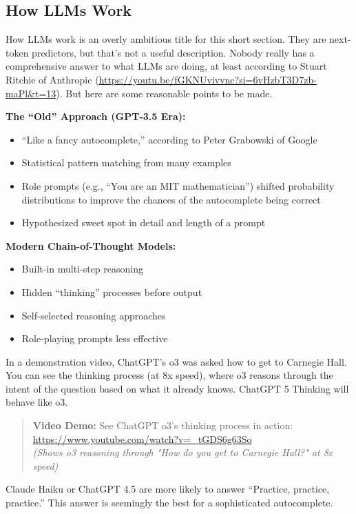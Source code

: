 \subsection{How LLMs Work}

How LLMs work is an overly ambitious title for this short section. They are next-token predictors, but that's not a useful description. Nobody really has a comprehensive answer to what LLMs are doing, at least according to Stuart Ritchie of Anthropic (\url{https://youtu.be/fGKNUvivvnc?si=6vHzbT3D7zb-maPl&t=13}). But here are some reasonable points to be made.

\textbf{The ``Old'' Approach (GPT-3.5 Era):}
\begin{itemize}
\item ``Like a fancy autocomplete,'' according to Peter Grabowski of Google
\item Statistical pattern matching from many examples
\item Role prompts (e.g., ``You are an MIT mathematician'') shifted probability distributions to improve the chances of the autocomplete being correct
\item Hypothesized sweet spot in detail and length of a prompt
\end{itemize}

\textbf{Modern Chain-of-Thought Models:}
\begin{itemize}
\item Built-in multi-step reasoning
\item Hidden ``thinking'' processes before output
\item Self-selected reasoning approaches
\item Role-playing prompts less effective
\end{itemize}

In a demonstration video, ChatGPT's o3 was asked how to get to Carnegie Hall. You can see the thinking process (at 8x speed), where o3 reasons through the intent of the question based on what it already knows. ChatGPT 5 Thinking will behave like o3.

\begin{quote}
\textbf{Video Demo:} See ChatGPT o3's thinking process in action: \\
\url{https://www.youtube.com/watch?v=_tGDS6g63So} \\
\textit{(Shows o3 reasoning through "How do you get to Carnegie Hall?" at 8x speed)}
\end{quote}

Claude Haiku or ChatGPT 4.5 are more likely to answer ``Practice, practice, practice.'' This answer is seemingly the best for a sophisticated autocomplete.


